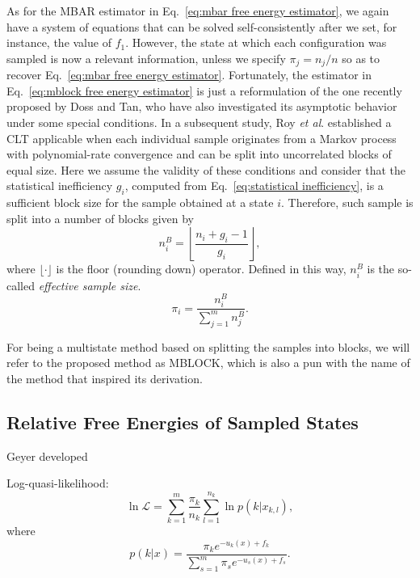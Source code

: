 \documentclass[aip,jcp,reprint,amsmath,amssymb]{revtex4-1}
\begin{document}
As for the MBAR estimator in Eq.~\eqref{eq:mbar free energy estimator}, we again have a system of equations that can be solved self-consistently after we set, for instance, the value of $f_1$. However, the state at which each configuration was sampled is now a relevant information, unless we specify $\pi_j = {n_j}/{n}$ so as to recover Eq.~\eqref{eq:mbar free energy estimator}. Fortunately, the estimator in Eq.~\eqref{eq:mblock free energy estimator} is just a reformulation of the one recently proposed by Doss and Tan,\cite{Doss_2014} who have also investigated its asymptotic behavior under some special conditions. In a subsequent study, Roy \textit{et al}.\cite{Roy_2018} established a CLT applicable when each individual sample originates from a Markov process with polynomial-rate convergence and can be split into uncorrelated blocks of equal size. Here we assume the validity of these conditions and consider that the statistical inefficiency $g_i$, computed from Eq.~\eqref{eq:statistical inefficiency}, is a sufficient block size for the sample obtained at a state $i$. Therefore, such sample is split into a number of blocks given by
\begin{equation*}
\label{eq:mblock number of blocks}
n^B_i = \left\lfloor \frac{n_i + g_i - 1}{g_i} \right\rfloor,
\end{equation*}
where $\lfloor \cdot \rfloor$ is the floor (rounding down) operator. Defined in this way, $n^B_i$ is the so-called \textit{effective sample size}.
\begin{equation}
\label{eq:mblock prior}
\pi_i = \frac{n^B_i}{\sum_{j=1}^m n^B_j}.
\end{equation}

For being a multistate method based on splitting the samples into blocks, we will refer to the proposed method as MBLOCK, which is also a pun with the name of the method that inspired its derivation.

\subsection{Relative Free Energies of Sampled States}



Geyer\cite{Geyer_1994} developed 

Log-quasi-likelihood:\cite{Doss_2014, Tan_2015, Roy_2018}
\begin{equation}
\label{eq:gmbar log quasi-likelihood}
\ln \mathcal L = \sum_{k=1}^m \frac{\pi_k}{n_k} \sum_{l=1}^{n_k} \ln p(k|x_{k,l}),
\end{equation}
where
\begin{equation*}
p(k|x) = \frac{\pi_k e^{-u_k(x) + f_k}}{\sum_{s=1}^m \pi_s e^{-u_s(x) + f_s}}.
\end{equation*}
\end{document}
